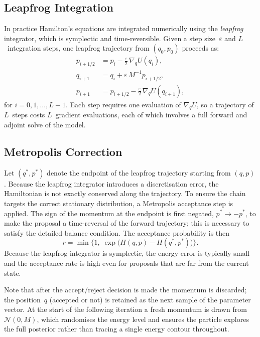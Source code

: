 \subsection{Leapfrog Integration}

In practice Hamilton's equations are integrated numerically using the
\emph{leapfrog} integrator, which is symplectic and
time-reversible. Given a step size~$\varepsilon$ and $L$~integration
steps, one leapfrog trajectory from $(q_0, p_0)$ proceeds as:
\begin{equation}
  \begin{aligned}
    p_{i+1/2} &= p_i - \tfrac{\varepsilon}{2}\,\nabla_q U(q_i), \\
    q_{i+1}   &= q_i + \varepsilon\, M^{-1} p_{i+1/2}, \\
    p_{i+1}   &= p_{i+1/2} - \tfrac{\varepsilon}{2}\,\nabla_q U(q_{i+1}),
  \end{aligned}
  \label{eq:leapfrog}
\end{equation}
for $i = 0, 1, \ldots, L-1$. Each step requires one evaluation of
$\nabla_q U$, so a trajectory of $L$~steps costs $L$~gradient
evaluations, each of which involves a full forward and adjoint solve of
the model.

\subsection{Metropolis Correction}

Let $(q^*, p^*)$ denote the endpoint of the leapfrog trajectory starting
from $(q, p)$. Because the leapfrog integrator introduces a discretisation
error, the Hamiltonian is not exactly conserved along the trajectory. To
ensure the chain targets the correct stationary distribution, a
Metropolis acceptance step is applied. The sign of the momentum at the
endpoint is first negated, $p^* \to -p^*$, to make the proposal a
time-reversal of the forward trajectory; this is necessary to satisfy the
detailed balance condition. The acceptance probability is then
\begin{equation}
  r = \min\!\big\{1,\; \exp\!\big(H(q, p) - H(q^*, p^*)\big)\big\}.
  \label{eq:hmc-acceptance}
\end{equation}
Because the leapfrog integrator is symplectic, the energy error is
typically small and the acceptance rate is high even for proposals that
are far from the current state.

Note that after the accept/reject decision is made the momentum is
discarded; the position~$q$ (accepted or not) is retained as the next
sample of the parameter vector. At the start of the following iteration a
fresh momentum is drawn from $\mathcal{N}(0, M)$, which randomises the
energy level and ensures the particle explores the full posterior rather
than tracing a single energy contour throughout.

